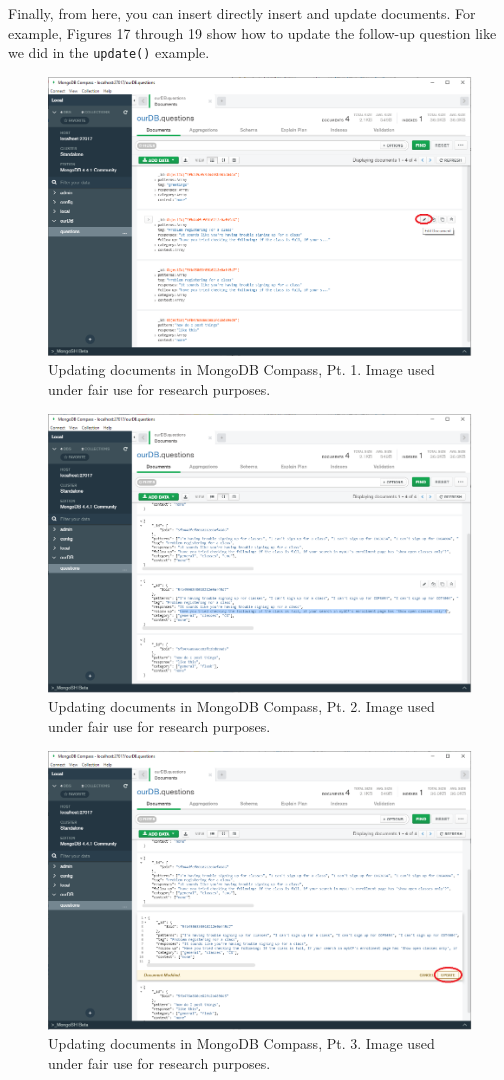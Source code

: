 \documentclass[titlepage, 12pt]{article}
\begin{document}
Finally, from here, you can insert directly insert and update documents. For example, Figures 17 through 19 show how to update the follow-up question like we did in the \texttt{update()} example.

\begin{figure}[p]
    \centering\includegraphics[width=0.75\linewidth]{images/mongodb-compass-5.png}
    \caption{Updating documents in MongoDB Compass, Pt. 1. Image used under fair use for research purposes.}
\end{figure}

\begin{figure}[p]
    \centering\includegraphics[width=0.75\linewidth]{images/mongodb-compass-6.png}
    \caption{Updating documents in MongoDB Compass, Pt. 2. Image used under fair use for research purposes.}
\end{figure}

\begin{figure}[p]
    \centering\includegraphics[width=0.75\linewidth]{images/mongodb-compass-7.png}
    \caption{Updating documents in MongoDB Compass, Pt. 3. Image used under fair use for research purposes.}
\end{figure}
\end{document}
